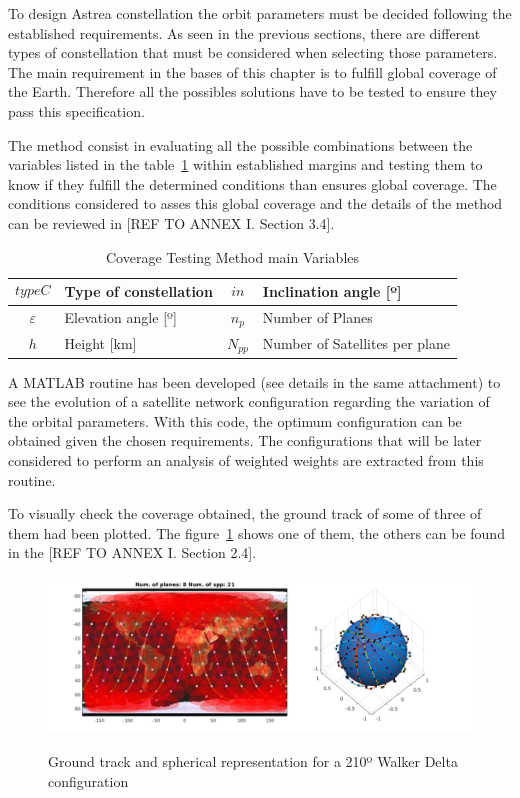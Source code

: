 
To design Astrea constellation the orbit parameters must be decided following the established requirements. As seen in the previous sections, there are different types of constellation that must be considered when selecting those parameters. The main requirement in the bases of this chapter is to fulfill global coverage of the Earth. Therefore all the possibles solutions have to be tested to ensure they pass this specification.

The method consist in evaluating all the possible combinations between the variables listed in the table~\ref{t:CovVar} within established margins and  testing them to know if they fulfill the determined conditions than ensures global coverage. The conditions considered to asses this global coverage and the details of the method can be reviewed in [REF TO ANNEX I. Section 3.4]. %

\begin{table}[H]
\centering
\begin{tabular}{|c|l|c|l|}
\hline
$$typeC$$     & Type of constellation    & $$in$$  & Inclination angle {[}º{]} \\ \hline
$\varepsilon$ & Elevation angle {[}º{]}  & $n_{p}$ & Number of Planes                          \\ \hline
$$h$$         & Height  {[}km{]}  & $N_{pp}$ & Number of Satellites per plane            \\ \hline
\end{tabular}
\caption{Coverage Testing Method main Variables}
\label{t:CovVar}
\end{table}  

A MATLAB routine has been developed (see details in the same attachment) to see the evolution of a satellite network configuration regarding the variation of the orbital parameters. With this code, the optimum configuration can be obtained given the chosen requirements. The configurations that will be later considered to perform an analysis of weighted weights are extracted from this routine.

To visually check the coverage obtained, the ground track of some of three of them had been plotted. The figure~\ref{fig:gt210} shows one of them, the others can be found in the [REF TO ANNEX I. Section 2.4]. 


\begin{figure}[H] %
	\centering
	\includegraphics[width=.8\textwidth]{./testing/WB210.png}\\
	\caption{Ground track and spherical representation for a 210º Walker Delta configuration}
	\label{fig:gt210}
\end{figure}